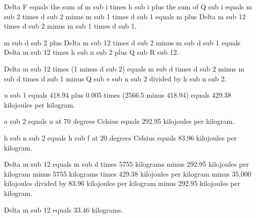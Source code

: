 Delta F equals the sum of m sub i times h sub i plus the sum of Q sub i equals m sub 2 times d sub 2 minus m sub 1 times d sub 1 equals m plus Delta m sub 12 times d sub 2 minus m sub 1 times d sub 1.  

m sub d sub 2 plus Delta m sub 12 times d sub 2 minus m sub d sub 1 equals Delta m sub 12 times h sub n sub 2 plus Q sub R sub 12.  

Delta m sub 12 times (1 minus d sub 2) equals m sub d times d sub 2 minus m sub d times d sub 1 minus Q sub e sub n sub 2 divided by h sub n sub 2.  

u sub 1 equals 418.94 plus 0.005 times (2566.5 minus 418.94) equals 429.38 kilojoules per kilogram.  

a sub 2 equals u at 70 degrees Celsius equals 292.95 kilojoules per kilogram.  

h sub n sub 2 equals h sub f at 20 degrees Celsius equals 83.96 kilojoules per kilogram.  

Delta m sub 12 equals m sub d times 5755 kilograms minus 292.95 kilojoules per kilogram minus 5755 kilograms times 429.38 kilojoules per kilogram minus 35,000 kilojoules divided by 83.96 kilojoules per kilogram minus 292.95 kilojoules per kilogram.  

Delta m sub 12 equals 33.46 kilograms.